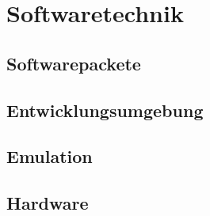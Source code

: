 
\chapter{Softwaretechnik}

\section{Softwarepackete}

\section{Entwicklungsumgebung}

\section{Emulation}

\section{Hardware}

